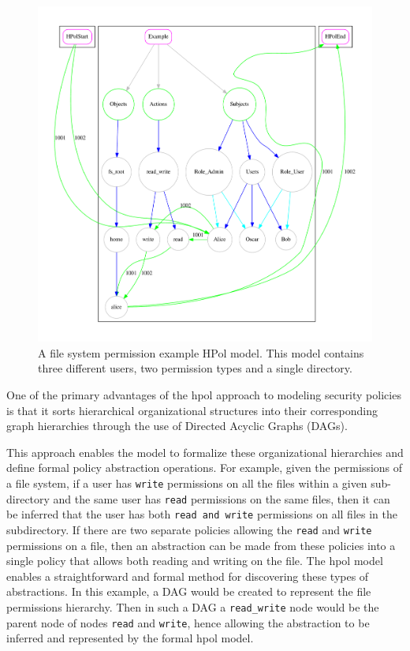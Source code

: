 \documentclass[12pt,letterpaper]{report}
\newcommand{\node}[1]{\texttt{#1}}
\begin{document}
\begin {figure}%
\centering
\includegraphics[width=\textwidth]{NewSELinux-AliceDirReadWrite.pdf}%
\caption[File System Permission Example]{A file system permission example HPol model. This model contains three different users, two permission types and a single directory.}%
\label{SELinuxAliceDirExample}%
\end {figure}%

\label{Section:FormalPolicyAbstraction}

One of the primary advantages of the \ac{hpol} approach to modeling security policies is that it sorts hierarchical organizational structures into their corresponding graph hierarchies through the use of Directed Acyclic Graphs (DAGs).

This approach enables the model to formalize these organizational hierarchies and define formal policy abstraction operations. For example, given the permissions of a file system, if a user has \node{write} permissions on all the files within a given sub-directory and the same user has \node{read} permissions on the same files, then it can be inferred that the user has both \node{read and write} permissions on all files in the subdirectory. If there are two separate policies allowing the \texttt{read} and \texttt{write} permissions on a file, then an abstraction can be made from these policies into a single policy that allows both reading and writing on the file. The \ac{hpol} model enables a straightforward and formal method for discovering these types of abstractions. In this example, a DAG would be created to represent the file permissions hierarchy. Then in such a DAG a \node{read\_write} node would be the parent node of nodes \node{read} and \node{write}, hence allowing the abstraction to be inferred and represented by the formal \ac{hpol} model.
\end{document}
